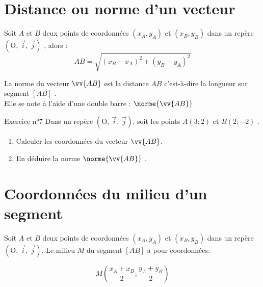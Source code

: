 \documentclass[12pt,a4paper]{article}
\def\Oij{$\left(\text{O},~\vec{i},~\vec{j}\right)$}
\begin{document}
\begin{framed}
\vspace{3cm}
\end{framed}











\section{Distance ou norme d'un vecteur}

\begin{pro}
Soit $A$ et $B$ deux points de coordonnées $(x_A,y_A)$ et $(x_B,y_B)$ dans un repère \Oij{} , alors :
$$AB=\sqrt{(x_B-x_A)^2+(y_B-y_A)^2}$$

La norme du vecteur $\vv{AB}$ est la distance $AB$ c'est-à-dire la longueur sur segment $[AB]$ .\\
Elle se note à l'aide d'une double barre : $\norme{\vv{AB}}$ 
\end{pro}


\begin{mybox}{Exercice n°7}
Dans un repère \Oij{}, soit les points $A(3;2)$ et $B(2; -2)$ .

\begin{enumerate}
    \item Calculer les coordonnées du vecteur $\vv{AB}$.
    \item En déduire la norme $\norme{\vv{AB}}$ .
\end{enumerate}

\end{mybox}

\begin{framed}
\vspace{3cm}
\end{framed}


\section{Coordonnées du milieu d'un segment}


\begin{pro}
Soit $A$ et $B$ deux points de coordonnées $(x_A,y_A)$ et $(x_B,y_B)$ dans un repère \Oij{}.
Le milieu $M$ du segment $[AB]$ a pour coordonnées:

$$M\left(\dfrac{x_A+x_B}{2};\dfrac{y_A+y_B}{2}\right)$$
\end{pro}
\end{document}
